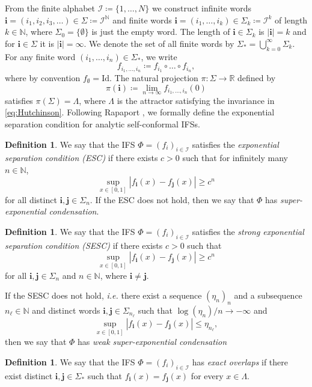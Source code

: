 \documentclass[12pt,]{article}
\def\cref#1{\ref{#1}}%
\theoremstyle{definition}
\newtheorem{definition}[theorem]{Definition}
\theoremstyle{remark}
\renewcommand{\Bbb}[1]{\mathbb{#1}}
\newcommand{\bbN}{{\Bbb N}}         %
\newcommand{\bbR}{{\Bbb R}}        %
\newcommand{\0}{\mathbf{0}}
\newcommand{\ie}{{\it i.e.}\/ }
\newcommand{\bi}{\mathbf{i}}
\newcommand{\bj}{\mathbf{j}}
\begin{document}
From the finite alphabet $\mathcal{I}\coloneqq\{1,\ldots,N\}$ we construct infinite words
$\bi=(i_1,i_2,i_3,\dots) \in\Sigma \coloneqq \mathcal{I}^{\bbN}$ and finite words
$\bi=(i_1,\ldots,i_k)\in \Sigma_k\coloneqq \mathcal{I}^k$ of length $k\in\mathbb{N}$, where
$\Sigma_0=\{\emptyset\}$ is just the empty word. The length of $\bi\in\Sigma_k$ is $|\bi|=k$ and for
$\bi\in\Sigma$ it is $|\bi|=\infty$. We denote the set of all finite words by $\Sigma_* =
\bigcup_{k=0}^\infty \Sigma_k$. For any finite word $(i_1,\dots,i_n)\in\Sigma_*$, we write
\[
f_{i_1,\dots,i_n}\coloneqq f_{i_1}\circ \dots \circ f_{i_n},
\]
where by convention $f_{\emptyset}=\mathrm{Id}$. The natural projection $\pi\colon\Sigma\to\bbR$ defined by
\begin{equation}\label{eq:natProj}
\pi(\bi)\coloneqq\lim_{n\to\infty}f_{i_1,\dots,i_n}(0)
\end{equation}
satisfies $\pi(\Sigma)=\Lambda$, where $\Lambda$ is the attractor satisfying the invariance in
\cref{eq:Hutchinson}. 
Following Rapaport \cite{Rapaport_SelfConfESC25arXiv}, we formally define the exponential separation
condition for analytic self-conformal IFSs.
\begin{definition}
  We say that the IFS $\Phi=(f_i)_{i\in\mathcal{I}}$ 
  satisfies the \emph{exponential separation condition (ESC)} if there exists $c>0$ such that for
  infinitely many $n\in\mathbb{N}$,
  \[
    \sup_{x\in[0,1]} |f_{\bi}(x)-f_{\bj}(x)| \geq c^n
  \]
  for all distinct $\bi,\bj\in\Sigma_n$. If the ESC does not hold,
  then we say that $\Phi$ has \emph{super-exponential condensation}.	
\end{definition}
\begin{definition}\label{def:SESC}
  We say that the IFS $\Phi=(f_i)_{i\in\mathcal{I}}$ 
  satisfies the \emph{strong exponential separation condition (SESC)} if there exists $c>0$ such that
  \[
    \sup_{x\in[0,1]} |f_{\bi}(x)-f_{\bj}(x)| \geq c^n
  \]
  for all $\bi,\bj\in\Sigma_n$ and $n\in\bbN$, where $\bi\neq\bj$. 

  If the SESC does not hold, \ie there exist a sequence $(\eta_n)_n$ and a subsequence
  $n_{\ell}\in\bbN$ and distinct words $\bi,\bj\in\Sigma_{n_\ell}$ such that
  $\log(\eta_n)/n\to-\infty$ and
  \[
    \sup_{x\in[0,1]}|f_{\bi}(x)-f_{\bj}(x)| \leq \eta_{n_\ell},
  \]
  then we say that $\Phi$ has \emph{weak super-exponential condensation}
\end{definition}
\begin{definition}
  We say that the IFS $\Phi=(f_i)_{i\in\mathcal{I}}$ 
 has \emph{exact overlaps} if there exist distinct $\bi,\bj\in\Sigma_*$ such that
 $f_{\bi}(x)=f_{\bj}(x)$ for every $x\in\Lambda$. 
\end{definition}
\end{document}

